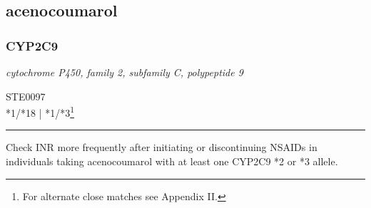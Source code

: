 \documentclass{report}
\begin{document}
      \newpage
      \normalsize























\subsection{ acenocoumarol }

\subsubsection{ CYP2C9 }
     \textit{ cytochrome P450, family 2, subfamily C, polypeptide 9 } \begin{flushright} \textsc{ STE0097 \\ *1/*18  | *1/*3\footnote{For alternate close matches see Appendix II.} }\end{flushright}
      \hrule \vspace{6pt}
      Check INR more frequently after initiating or discontinuing NSAIDs in individuals taking acenocoumarol with at least one CYP2C9 *2 or *3 allele. \newline
      \scriptsize
      
\end{document}
